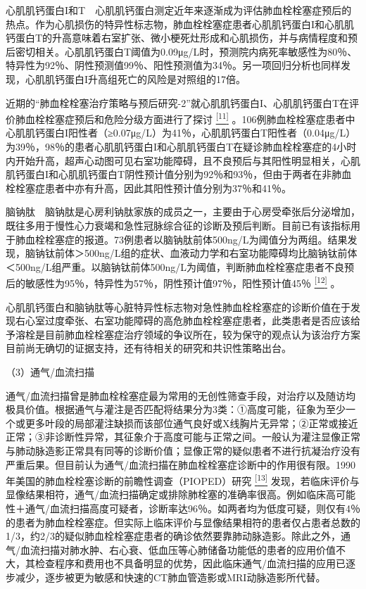 心肌肌钙蛋白I和T　心肌肌钙蛋白测定近年来逐渐成为评估肺血栓栓塞症预后的热点。作为心肌损伤的特异性标志物，肺血栓栓塞症患者心肌肌钙蛋白I和心肌肌钙蛋白T的升高意味着右室扩张、微小梗死灶形成和心肌损伤，并与病情程度和预后密切相关。心肌肌钙蛋白T阈值为0.09μg/L时，预测院内病死率敏感性为80％、特异性为92％、阴性预测值99％、阳性预测值为34％。另一项回归分析也同样发现，心肌肌钙蛋白I升高组死亡的风险是对照组的17倍。

近期的“肺血栓栓塞治疗策略与预后研究-2”就心肌肌钙蛋白I、心肌肌钙蛋白T在评价肺血栓栓塞症预后和危险分级方面进行了探讨
\protect\hyperlink{text00022.htmlux5cux23ch11-21}{\textsuperscript{{[}11{]}}}
。106例肺血栓栓塞症患者中心肌肌钙蛋白I阳性者（≥0.07μg/L）为41％，心肌肌钙蛋白T阳性者（0.04μg/L）为39％，98％的患者心肌肌钙蛋白I和心肌肌钙蛋白T在疑诊肺血栓栓塞症的4小时内开始升高，超声心动图可见右室功能障碍，且不良预后与其阳性明显相关，心肌肌钙蛋白I和心肌肌钙蛋白T阴性预计值分别为92％和93％，但由于两者在非肺血栓栓塞症患者中亦有升高，因此其阳性预计值分别为37％和41％。

脑钠肽　脑钠肽是心房利钠肽家族的成员之一，主要由于心房受牵张后分泌增加，既往多用于慢性心力衰竭和急性冠脉综合征的诊断及预后判断。目前已有该指标用于肺血栓栓塞症的报道。73例患者以脑钠肽前体500ng/L为阈值分为两组。结果发现，脑钠钛前体＞500ng/L组的症状、血液动力学和右室功能障碍均比脑钠钛前体＜500ng/L组严重。以脑钠钛前体500ng/L为阈值，判断肺血栓栓塞症患者不良预后的敏感性为95％，特异性为57％，阴性预计值97％，阳性预计值45％
\protect\hyperlink{text00022.htmlux5cux23ch12-21}{\textsuperscript{{[}12{]}}}
。

心肌肌钙蛋白和脑钠肽等心脏特异性标志物对急性肺血栓栓塞症的诊断价值在于发现右心室过度牵张、右室功能障碍的高危肺血栓栓塞症患者，此类患者是否应该给予溶栓是目前肺血栓栓塞症治疗领域的争议所在，较为保守的观点认为该治疗方案目前尚无确切的证据支持，还有待相关的研究和共识性策略出台。

（3）通气/血流扫描

通气/血流扫描曾是肺血栓栓塞症最为常用的无创性筛查手段，对治疗以及随访均极具价值。根据通气与灌注是否匹配将结果分为3类：①高度可能，征象为至少一个或更多叶段的局部灌注缺损而该部位通气良好或X线胸片无异常；②正常或接近正常；③非诊断性异常，其征象介于高度可能与正常之间。一般认为灌注显像正常与肺动脉造影正常具有同等的诊断价值；显像正常的疑似患者不进行抗凝治疗没有严重后果。但目前认为通气/血流扫描在肺血栓栓塞症诊断中的作用很有限。1990年美国的肺血栓栓塞诊断的前瞻性调查（PIOPED）研究
\protect\hyperlink{text00022.htmlux5cux23ch13-21}{\textsuperscript{{[}13{]}}}
发现，若临床评价与显像结果相符，通气/血流扫描确定或排除肺栓塞的准确率很高。例如临床高可能性＋通气/血流扫描高度可疑者，诊断率达96％。如两者均为低度可疑，则仅有4％的患者为肺血栓栓塞症。但实际上临床评价与显像结果相符的患者仅占患者总数的1/3，约2/3的疑似肺血栓栓塞症患者的确诊依然要靠肺动脉造影。除此之外，通气/血流扫描对肺水肿、右心衰、低血压等心肺储备功能低的患者的应用价值不大，其检查程序和费用也不具备明显的优势，因此临床通气/血流扫描的应用已逐步减少，逐步被更为敏感和快速的CT肺血管造影或MRI动脉造影所代替。

